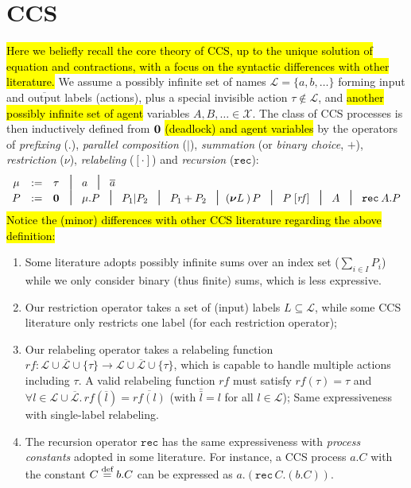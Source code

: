 
\section{CCS}
\label{ss:ccs}

\hl{Here we beliefly recall the core theory of CCS, up to the unique solution of
equation and contractions, with a focus on the syntactic differences with
other literature.}
We assume a possibly infinite set of names $\mathscr{L} = \{a, b,
\ldots\}$ forming input and $\overline{\mbox{output}}$ labels (actions), plus a special invisible
action $\tau \notin \mathscr{L}$, and \hl{another possibly infinite
  set of agent} variables $A, B,
\ldots \in \mathscr{X}$.
The class of CCS processes is then inductively
defined from ${\boldsymbol 0}$ \hl{(deadlock) and agent variables} by the operators
of \emph{prefixing} (.), \emph{parallel composition} ($|$),
\emph{summation}
(or \emph{binary choice}, $+$),
\emph{restriction} ($\nu$), \emph{relabeling} ($[\cdot]$) and
\emph{recursion} ($\texttt{rec}$):
\begin{equation*}
\begin{array}{cccl}
\mu  & := & \tau\!\!\!\! & \midd \; a  \; \midd \;  \outC a  \\
P  & := & \nil\!\!\!\! & \midd \;  \mu . P \; \midd \;  P_1 |  P_2 \; \midd  \;
P_1 + P_2 \; \midd 
(\res L)\, P
\; \midd \; P\; [\mathit{rf}]  %
\;  \midd \;  A \; \midd \; \recu A  P
\end{array}
\end{equation*}
\hl{Notice the (minor) differences with other CCS literature regarding the above definition:}
\begin{enumerate}
  \item Some literature adopts possibly infinite sums over an index
    set ($\sum_{i\in I} P_i$) while we only consider binary (thus
    finite) sums, which is less expressive.
  \item Our restriction operator takes a set of (input) labels $L
    \subseteq \mathscr{L}$, while some CCS literature only restricts
    one label (for each restriction operator);
  \item Our relabeling operator takes a relabeling function
    $\mathit{rf} \colon \mathscr{L} \cup \overline{\mathscr{L}} \cup
    \{\tau\} \rightarrow \mathscr{L} \cup \overline{\mathscr{L}} \cup
    \{\tau\}$, which
    is capable to handle multiple actions including $\tau$. A valid
    relabeling function $\mathit{rf}$ must satisfy $\mathit{rf}(\tau) =
    \tau$ and $\forall l\in\mathscr{L} \cup \overline{\mathscr{L}}.\, \mathit{rf}(\overline{l}) =
    \overline{\mathit{rf}(l)}$ (with $\bar{\bar l} = l$ for all $l \in
    \mathscr{L}$); Same expressiveness
    with single-label relabeling.
  \item The recursion operator $\texttt{rec}$ has the same expressiveness with
    \emph{process constants} adopted in some literature. For instance, a
    CCS process $a.C$ with the constant $C \stackrel{\mbox{\scriptsize def}}{=} b.C$ can be
    expressed as $a.(\texttt{rec}\, C. (b.C))$.
\end{enumerate}
